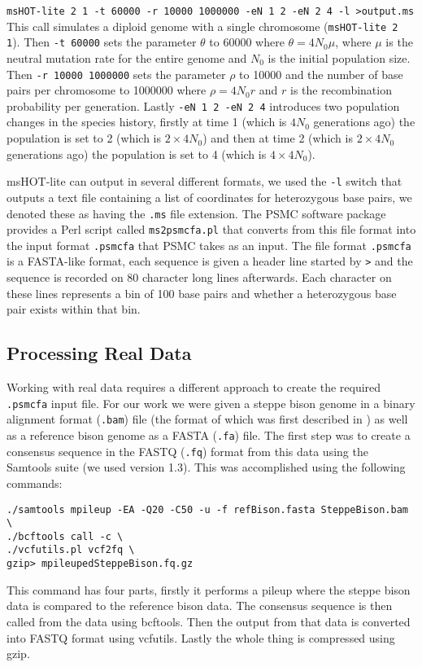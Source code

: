 \documentclass[]{article}
\begin{document}
\verb|msHOT-lite 2 1 -t 60000 -r 10000 1000000 -eN 1 2 -eN 2 4 -l >output.ms| 
This call simulates a diploid genome with a single chromosome (\verb|msHOT-lite 2 1|). Then \verb|-t 60000| sets the parameter $\theta$ to 60000 where $\theta=4N_0\mu$, where $\mu$ is the neutral mutation rate for the entire genome and $N_0$ is the initial population size. Then \verb|-r 10000 1000000| sets the parameter $\rho$ to 10000 and the number of base pairs per chromosome to 1000000 where $\rho=4N_0r$ and $r$ is the recombination probability per generation. Lastly \verb|-eN 1 2 -eN 2 4| introduces two population changes in the species history, firstly at time 1 (which is $4N_0$ generations ago) the population is set to 2 (which is $2\times4N_0$) and then at time 2 (which is $2\times4N_0$ generations ago) the population is set to 4 (which is $4\times4N_0$).

msHOT-lite can output in several different formats, we used the \verb|-l| switch that outputs a text file containing a list of coordinates for heterozygous base pairs, we denoted these as having the \verb|.ms| file extension. The PSMC software package \cite{li2011inference} provides a Perl script called \verb|ms2psmcfa.pl| that converts from this file format into the input format \verb|.psmcfa| that PSMC takes as an input. The file format \verb|.psmcfa| is a FASTA-like format, each sequence is given a header line started by \verb|>| and the sequence is recorded on 80 character long lines afterwards. Each character on these lines represents a bin of 100 base pairs and whether a heterozygous base pair exists within that bin.

\subsection{Processing Real Data}
Working with real data requires a different approach to create the required \verb|.psmcfa| input file. For our work we were given a steppe bison genome in a binary alignment format (\verb|.bam|) file (the format of which was first described in \cite{li2009sequence}) as well as a reference bison genome as a FASTA (\verb|.fa|) file. The first step was to create a consensus sequence in the FASTQ (\verb|.fq|) format from this data using the Samtools suite (we used version 1.3). This was accomplished using the following commands:
\begin{verbatim}
./samtools mpileup -EA -Q20 -C50 -u -f refBison.fasta SteppeBison.bam \ 
./bcftools call -c \
./vcfutils.pl vcf2fq \
gzip> mpileupedSteppeBison.fq.gz
\end{verbatim}
This command has four parts, firstly it performs a pileup where the steppe bison data is compared to the reference bison data. The consensus sequence is then called from the data using bcftools. Then the output from that data is converted into FASTQ format using vcfutils. Lastly the whole thing is compressed using gzip. 
\end{document}
